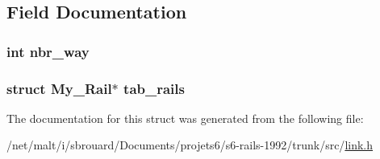 \subsection{Field Documentation}
\hypertarget{structLink_a40cf4e4cf21e1686e79e3996ad0f6193}{
\subsubsection[{nbr\-\_\-way}]{\setlength{\rightskip}{0pt plus 5cm}int nbr\-\_\-way}}\label{structLink_a40cf4e4cf21e1686e79e3996ad0f6193}
\hypertarget{structLink_ade94502d272c9618b413007c70ee7c83}{
\subsubsection[{tab\-\_\-rails}]{\setlength{\rightskip}{0pt plus 5cm}struct {\bf My\-\_\-\-Rail}$\ast$ tab\-\_\-rails}}\label{structLink_ade94502d272c9618b413007c70ee7c83}


The documentation for this struct was generated from the following file\-:\begin{DoxyCompactItemize}
\item 
/net/malt/i/sbrouard/\-Documents/projets6/s6-\/rails-\/1992/trunk/src/\hyperlink{link_8h}{link.\-h}\end{DoxyCompactItemize}
